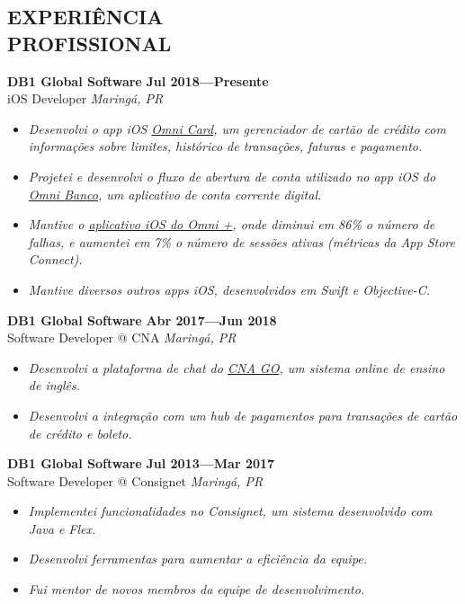 \documentclass[line,margin]{res}
\begin{document}


\address{\sl \href{https://marcosatanaka.com}{marcosatanaka.com} --- \href{mailto:marcosatanaka@gmail.com}{marcosatanaka@gmail.com}}


\begin{resume}


\section{EXPERIÊNCIA \\ PROFISSIONAL}
  {\bf DB1 Global Software} \hfill {\bf Jul 2018---Presente} \\
  iOS Developer \hfill {\sl Maring\'a, PR}\\[-6pt]
  \begin{itemize}
    \item {\sl Desenvolvi o app iOS \href{https://apps.apple.com/us/app/id1490242421}{Omni Card}, um gerenciador de cartão de crédito com informações sobre limites, histórico de transações, faturas e pagamento.}
    \item {\sl Projetei e desenvolvi o fluxo de abertura de conta utilizado no app iOS do \href{https://apps.apple.com/br/app/omni-banco/id1369601365}{Omni Banco}, um aplicativo de conta corrente digital.}
    \item {\sl Mantive o \href{https://apps.apple.com/br/app/omni/id1276332750}{aplicativo iOS do Omni +}, onde diminui em 86\% o número de falhas, e aumentei em 7\% o número de sessões ativas (métricas da App Store Connect).}
    \item {\sl Mantive diversos outros apps iOS, desenvolvidos em Swift e Objective-C.}
  \end{itemize}

  {\bf DB1 Global Software} \hfill {\bf Abr 2017---Jun 2018} \\
  Software Developer @ CNA \hfill {\sl Maring\'a, PR}\\[-6pt]
  \begin{itemize}
    \item {\sl Desenvolvi a plataforma de chat do \href{https://www.cnago.com.br}{CNA GO}, um sistema online de ensino de inglês.}
    \item {\sl Desenvolvi a integração com um hub de pagamentos para transações de cartão de crédito e boleto.}
  \end{itemize}

  {\bf DB1 Global Software} \hfill {\bf Jul 2013---Mar 2017} \\
  Software Developer @ Consignet \hfill {\sl Maring\'a, PR}\\[-6pt]
  \begin{itemize}
    \item {\sl Implementei funcionalidades no Consignet, um sistema desenvolvido com Java e Flex.}
    \item {\sl Desenvolvi ferramentas para aumentar a eficiência da equipe.}
    \item {\sl Fui mentor de novos membros da equipe de desenvolvimento.}
  \end{itemize}


\end{resume}
\end{document}
